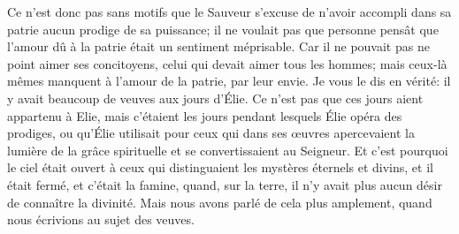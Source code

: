 Ce n’est donc pas sans motifs
		que le Sauveur s’excuse de n’avoir accompli dans sa patrie
	aucun prodige de sa puissance;
	il ne voulait pas que personne pensât que l’amour dû à la patrie
	était un sentiment méprisable.
Car il ne pouvait pas ne point aimer ses concitoyens,
	celui qui devait aimer tous les hommes;
	mais ceux-là mêmes manquent à l’amour de la patrie, par leur envie.
Je vous le dis en vérité: il y avait beaucoup de veuves aux jours d’Élie.
Ce n’est pas que ces jours aient appartenu à Elie,
	mais c’étaient les jours pendant lesquels Élie opéra des prodiges,
	ou qu’Élie utilisait pour ceux
		qui dans ses œuvres apercevaient la lumière de la grâce spirituelle
	et se convertissaient au Seigneur.
Et c’est pourquoi le ciel était ouvert
		à ceux qui distinguaient les mystères éternels et divins,
	et il était fermé, et c’était la famine,
	quand, sur la terre, il n’y avait plus aucun désir de connaître la divinité.
	Mais nous avons parlé de cela plus amplement,
		quand nous écrivions au sujet des veuves.
